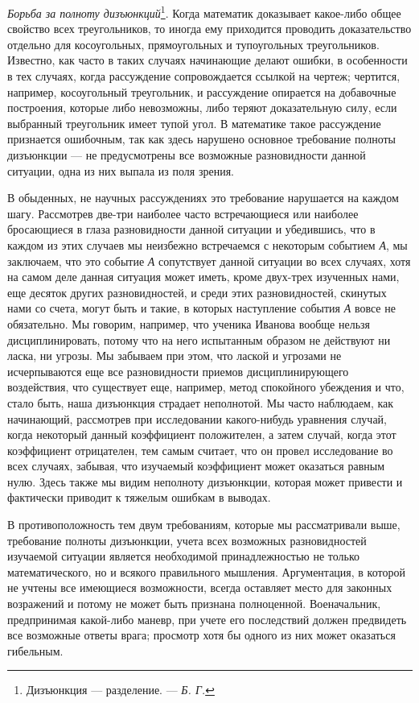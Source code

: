 \documentclass[12pt, a4paper, openany]{book}
\begin{document}
\textit{Борьба за полноту дизъюнкций}{\footnote{Дизъюнкция — разделение. — \textit{Б. Г.}}}. Когда математик доказывает какое-либо общее свойство всех треугольников, то иногда ему приходится проводить доказательство отдельно для косоугольных, прямоугольных и тупоугольных треугольников. Известно, как часто в таких случаях  начинающие делают ошибки, в особенности в тех случаях,  когда рассуждение сопровождается ссылкой на чертеж;  чертится, например, косоугольный треугольник, и рассуждение опирается на добавочные построения, которые либо  невозможны, либо теряют доказательную силу, если  выбранный треугольник имеет тупой угол. В математике такое  рассуждение признается ошибочным, так как здесь нарушено основное требование полноты дизъюнкции — не  предусмотрены все возможные разновидности данной ситуации, одна из них выпала из поля зрения. 

В обыденных, не научных рассуждениях это требование нарушается на каждом шагу. Рассмотрев две-три наиболее часто встречающиеся или наиболее бросающиеся в глаза разновидности данной ситуации и убедившись, что в  каждом из этих случаев мы неизбежно встречаемся с некоторым событием \textit{А}, мы заключаем, что это событие \textit{А}  сопутствует данной ситуации во всех случаях, хотя на самом деле данная ситуация может иметь, кроме двух-трех изученных нами, еще десяток других разновидностей, и среди этих разновидностей, скинутых нами со счета, могут быть и такие, в которых наступление события \textit{А} вовсе не  обязательно. Мы говорим, например, что ученика Иванова  вообще нельзя дисциплинировать, потому что на него  испытанным образом не действуют ни ласка, ни угрозы. Мы  забываем при этом, что лаской и угрозами не исчерпываются еще все разновидности приемов дисциплинирующего  воздействия, что существует еще, например, метод спокойного убеждения и что, стало быть, наша дизъюнкция страдает неполнотой. Мы часто наблюдаем, как начинающий,  рассмотрев при исследовании какого-нибудь уравнения  случай, когда некоторый данный коэффициент положителен, а затем случай, когда этот коэффициент отрицателен, тем самым считает, что он провел исследование во всех  случаях, забывая, что изучаемый коэффициент может оказаться равным нулю. Здесь также мы видим неполноту  дизъюнкции, которая может привести и фактически приводит к тяжелым ошибкам в выводах. 

В противоположность тем двум требованиям, которые мы рассматривали выше, требование полноты дизъюнкции, учета всех возможных разновидностей изучаемой ситуации является необходимой принадлежностью не только  математического, но и всякого правильного мышления. Аргументация, в которой не учтены все имеющиеся  возможности, всегда оставляет место для законных возражений и потому не может быть признана полноценной.  Военачальник, предпринимая какой-либо маневр, при учете его  последствий должен предвидеть все возможные ответы врага; просмотр хотя бы одного из них может оказаться  гибельным. 
\end{document}
